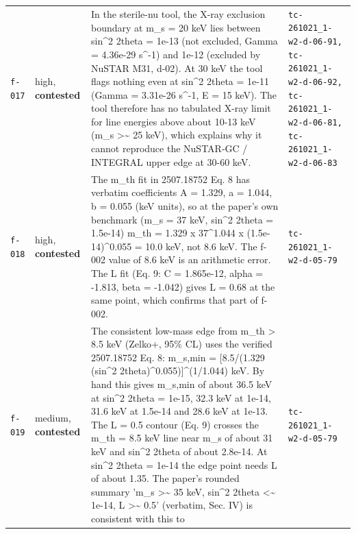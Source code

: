 \documentclass[11pt,a4paper]{article}
\begin{document}
\begin{longtable}{@{}p{}p{}p{}p{}@{}}
\texttt{f-017} & high, \textbf{contested} & In the sterile-nu tool, the X-ray exclusion boundary at m\_s = 20 keV lies between sin\textasciicircum{}2 2theta = 1e-13 (not excluded, Gamma = 4.36e-29 s\textasciicircum{}-1) and 1e-12 (excluded by NuSTAR M31, d-02). At 30 keV the tool flags nothing even at sin\textasciicircum{}2 2theta = 1e-11 (Gamma = 3.31e-26 s\textasciicircum{}-1, E = 15 keV). The tool therefore has no tabulated X-ray limit for line energies above about 10-13 keV (m\_s \textgreater{}\textasciitilde{} 25 keV), which explains why it cannot reproduce the NuSTAR-GC / INTEGRAL upper edge at 30-60 keV. & \texttt{tc-261021\_\allowbreak{}1-w2-d-06-91,\allowbreak{} tc-261021\_\allowbreak{}1-w2-d-06-92,\allowbreak{} tc-261021\_\allowbreak{}1-w2-d-06-81,\allowbreak{} tc-261021\_\allowbreak{}1-w2-d-06-83} \\
\texttt{f-018} & high, \textbf{contested} & The m\_th fit in 2507.18752 Eq. 8 has verbatim coefficients A = 1.329, a = 1.044, b = 0.055 (keV units), so at the paper's own benchmark (m\_s = 37 keV, sin\textasciicircum{}2 2theta = 1.5e-14) m\_th = 1.329 x 37\textasciicircum{}1.044 x (1.5e-14)\textasciicircum{}0.055 = 10.0 keV, not 8.6 keV. The f-002 value of 8.6 keV is an arithmetic error. The L fit (Eq. 9: C = 1.865e-12, alpha = -1.813, beta = -1.042) gives L = 0.68 at the same point, which confirms that part of f-002. & \texttt{tc-261021\_\allowbreak{}1-w2-d-05-79} \\
\texttt{f-019} & medium, \textbf{contested} & The consistent low-mass edge from m\_th \textgreater{} 8.5 keV (Zelko+, 95\% CL) uses the verified 2507.18752 Eq. 8: m\_s,min = [8.5/(1.329 (sin\textasciicircum{}2 2theta)\textasciicircum{}0.055)]\textasciicircum{}(1/1.044) keV. By hand this gives m\_s,min of about 36.5 keV at sin\textasciicircum{}2 2theta = 1e-15, 32.3 keV at 1e-14, 31.6 keV at 1.5e-14 and 28.6 keV at 1e-13. The L = 0.5 contour (Eq. 9) crosses the m\_th = 8.5 keV line near m\_s of about 31 keV and sin\textasciicircum{}2 2theta of about 2.8e-14. At sin\textasciicircum{}2 2theta = 1e-14 the edge point needs L of about 1.35. The paper's rounded summary 'm\_s \textgreater{}\textasciitilde{} 35 keV, sin\textasciicircum{}2 2theta \textless{}\textasciitilde{} 1e-14, L \textgreater{}\textasciitilde{} 0.5' (verbatim, Sec. IV) is consistent with this to  & \texttt{tc-261021\_\allowbreak{}1-w2-d-05-79} \\

\end{longtable}
\end{document}
